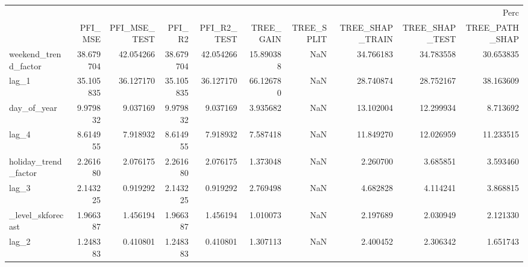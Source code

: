 \begin{tabular}{lrrrrrrrrr}
\toprule
 & \multicolumn{9}{r}{Perc} \\
 & PFI_MSE & PFI_MSE_TEST & PFI_R2 & PFI_R2_TEST & TREE_GAIN & TREE_SPLIT & TREE_SHAP_TRAIN & TREE_SHAP_TEST & TREE_PATH_SHAP \\
\midrule
weekend_trend_factor & 38.679704 & 42.054266 & 38.679704 & 42.054266 & 15.890388 & NaN & 34.766183 & 34.783558 & 30.653835 \\
lag_1 & 35.105835 & 36.127170 & 35.105835 & 36.127170 & 66.126780 & NaN & 28.740874 & 28.752167 & 38.163609 \\
day_of_year & 9.979832 & 9.037169 & 9.979832 & 9.037169 & 3.935682 & NaN & 13.102004 & 12.299934 & 8.713692 \\
lag_4 & 8.614955 & 7.918932 & 8.614955 & 7.918932 & 7.587418 & NaN & 11.849270 & 12.026959 & 11.233515 \\
holiday_trend_factor & 2.261680 & 2.076175 & 2.261680 & 2.076175 & 1.373048 & NaN & 2.260700 & 3.685851 & 3.593460 \\
lag_3 & 2.143225 & 0.919292 & 2.143225 & 0.919292 & 2.769498 & NaN & 4.682828 & 4.114241 & 3.868815 \\
_level_skforecast & 1.966387 & 1.456194 & 1.966387 & 1.456194 & 1.010073 & NaN & 2.197689 & 2.030949 & 2.121330 \\
lag_2 & 1.248383 & 0.410801 & 1.248383 & 0.410801 & 1.307113 & NaN & 2.400452 & 2.306342 & 1.651743 \\
\bottomrule
\end{tabular}
